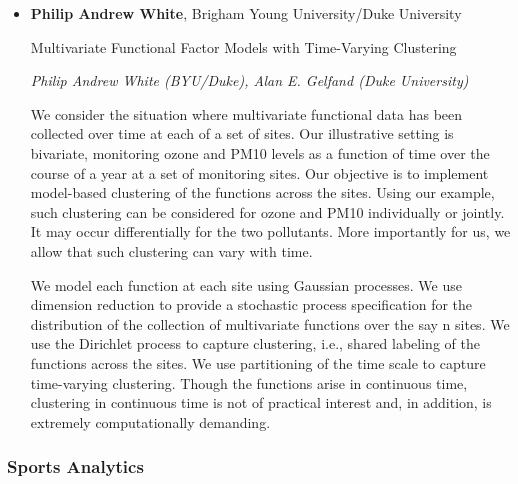 \begin{itemize}
\item \textbf{Philip Andrew White}, Brigham Young University/Duke University

Multivariate Functional Factor Models with Time-Varying Clustering

\emph{\footnotesize Philip Andrew White (BYU/Duke), Alan E. Gelfand (Duke University)}

We consider the situation where multivariate functional data has been collected over time at each of a set of sites. Our illustrative setting is bivariate, monitoring ozone and PM10 levels as a function of time over the course of a year at a set of monitoring sites. Our objective is to implement model-based clustering of the functions across the sites. Using our example, such clustering can be considered for ozone and PM10 individually or jointly. It may occur differentially for the two pollutants. More importantly for us, we allow that such clustering can vary with time.

We model each function at each site using Gaussian processes. We use dimension reduction to provide a stochastic process specification for the distribution of the collection of multivariate functions over the say n sites. We use the Dirichlet process to capture clustering, i.e., shared labeling of the functions across the sites. We use partitioning of the time scale to capture time-varying clustering. Though the functions arise in continuous time, clustering in continuous time is not of practical interest and, in addition, is extremely computationally demanding.

\end{itemize}

\subsubsection*{Sports Analytics}

